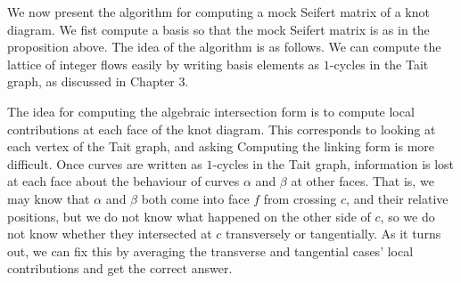 \documentclass[12pt]{report}
\theoremstyle{upright}
\begin{document}
We now present the algorithm for computing a mock Seifert matrix of a knot diagram. We fist compute a basis so that the mock Seifert matrix is as in the proposition above. The idea of the algorithm is as follows. We can compute the lattice of integer flows easily by writing basis elements as $1$-cycles in the Tait graph, as discussed in Chapter 3.

The idea for computing the algebraic intersection form is to compute local contributions at each face of the knot diagram. This corresponds to looking at each vertex of the Tait graph, and asking  Computing the linking form is more difficult. Once curves are written as $1$-cycles in the Tait graph, information is lost at each face about the behaviour of curves $\alpha$ and $\beta$ at other faces. That is, we may know that $\alpha$ and $\beta$ both come into face $f$ from crossing $c$, and their relative positions, but we do not know what happened on the other side of $c$, so we do not know whether they intersected at $c$ transversely or tangentially. As it turns out, we can fix this by averaging the transverse and tangential cases' local contributions and get the correct answer.
\end{document}
